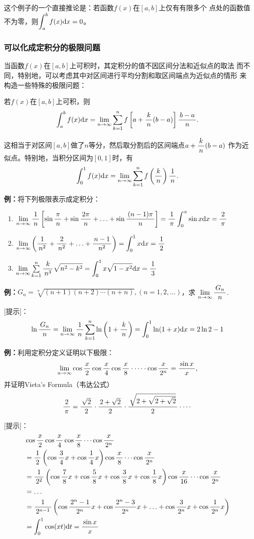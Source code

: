 这个例子的一个直接推论是：若函数$f(x)$在$[a,b]$上仅有有限多个
点处的函数值不为零，则$\dint_a^bf(x)\d x=0$。

\subsubsection{可以化成定积分的极限问题}

当函数$f(x)$在$[a,b]$上可积时，其定积分的值不因区间分法和近似点的取法
而不同，特别地，可以考虑其中对区间进行平均分割和取区间端点为近似点的情形
来构造一些特殊的极限问题：

\begin{thx}
	若$f(x)$在$[a,b]$上可积，则
	$$\dint_a^bf(x)\d x
	=\limn\sum\limits_{k=1}^nf\left[a+\df kn(b-a)\right]\df{b-a}n.$$
\end{thx}

这相当于对区间$[a,b]$做了$n$等分，然后取分割后的区间端点$a+\df kn(b-a)$
作为近似点。特别地，当积分区间为$[0,1]$时，有
$$\dint_0^1f(x)\d x=\limn\sum\limits_{k=1}^nf\left(\df kn\right)\df1n.$$

{\bf 例：}将下列极限表示成定积分：
\begin{enumerate}[(1)]
  \setlength{\itemindent}{1cm}
  \item $\limn\df 1n\left[\sin\df{\pi}{n}+\sin\df{2\pi}{n}+\ldots
  +\sin\df{(n-1)\pi}{n}\right]=\df1{\pi}\dint_0^{\pi}\sin x\d x=\df2{\pi}$ 
  \item $\limn\left(\df{1}{n^2}+\df{2}{n^2}+\ldots+\df{n-1}{n^2}\right)
  =\dint_0^1x\d x=\df12$
  \item $\limn\sum\limits_{k=1}^n\df{k}{n^3}\sqrt{n^2-k^2}
  =\dint_0^1x\sqrt{1-x^2}\d x=\df13$
\end{enumerate}

{\bf 例：}$G_n=\sqrt[n]{(n+1)(n+2)\cdots(n+n)},(n=1,2,\ldots)$，求
$\limn\df{G_n}n$.

[提示]：
$$\ln\df{G_n}n=\limn\df1n\sum\limits_{k=1}^n\ln\left(1+\df kn\right)
=\dint_0^1\ln(1+x)\d x=2\ln2-1$$

\begin{shaded}
{\bf 例：}利用定积分定义证明以下极限：
$$\limn\cos\df x2\cos\df x4\cos\df x8\cdot\cdots\cdot\cos\df x{2^n}
=\df{\sin x}x,$$
并证明Vieta's Formula（韦达公式）
$$\df2\pi=\df{\sqrt2}2\cdot\df{2+\sqrt2}2\cdot\df{\sqrt{2+\sqrt{2+\sqrt2}}}2
\cdot\cdots$$

[提示]：
\begin{align}
	&\cos\df x2\cos\df x4\cos\df x8\cdots\cos\df x{2^n}\notag\\
	&=\df12\left(\cos\df34x+\cos\df14x\right)\cos\df x8\cdots\cos\df
	x{2^n}\notag\\
	&=\df1{2^2}\left(\cos\df78x+\cos\df58x+\cos\df38x+\cos\df18x\right)
	\cos\df x{16}\cdots\cos\df x{2^n}\notag\\
	&=\ldots\notag\\
	&=\df1{2^{n-1}}\left(\cos\df{2^n-1}{2^n}x+\cos\df{2^n-3}{2^n}x+
	\ldots+\cos\df3{2^n}x+\cos\df1{2^n}x\right)\notag\\
	&=\dint_0^1\cos(xt)\d t=\df{\sin x}x\notag
\end{align}
\end{shaded}

